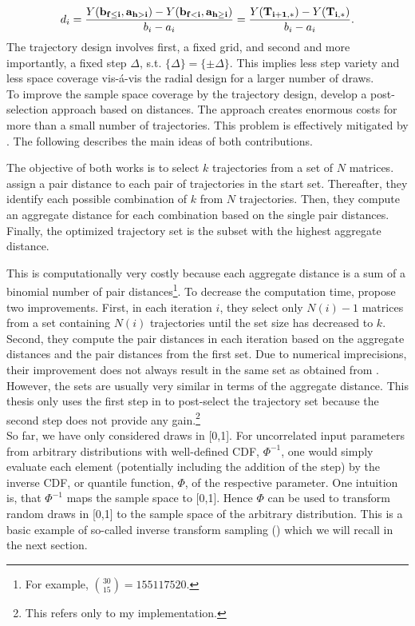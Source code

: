\begin{align} \label{eq:traj}
d_i =  \frac{Y(\bold{b_{f \leq i}}, \bold{a_{h>i}}) - Y(\bold{b_{f<i}}, \bold{a_{h \geq i}})}{b_i - a_i} = \frac{Y(\bold{T_{i+1,*})} -  Y(\bold{T_{i,*}})}{b_i - a_i}.
\end{align}
The trajectory design involves first, a fixed grid, and second and more importantly, a fixed step $\Delta$, s.t. $\{\Delta\} = \{\pm \Delta\}$. This implies less step variety and less space coverage vis-á-vis the radial design for a larger number of draws.\\

\noindent
To improve the sample space coverage by the trajectory design, \cite{campolongo2007effective} develop a post-selection approach based on distances. The approach creates enormous costs for more than a small number of trajectories. This problem is effectively mitigated by \cite{ge2014efficient}. The following describes the main ideas of both contributions.

The objective of both works is to select $k$ trajectories from a set of $N$ matrices. \cite{campolongo2007effective} assign a pair distance to each pair of trajectories in the start set. Thereafter, they identify each possible combination of $k$ from $N$ trajectories. Then, they compute an aggregate distance for each combination based on the single pair distances. Finally, the optimized trajectory set is the subset with the highest aggregate distance.

This is computationally very costly because each aggregate distance is a sum of a binomial number of pair distances\footnote{For example, $\binom{30}{15} = 155117520$.}. To decrease the computation time, \cite{ge2014efficient} propose two improvements. First, in each iteration $i$, they select only $N(i)-1$ matrices from a set containing $N(i)$ trajectories until the set size has decreased to $k$. Second, they compute the pair distances in each iteration based on the aggregate distances and the pair distances from the first set. Due to numerical imprecisions, their improvement does not always result in the same set as obtained from \cite{campolongo2007effective}. However, the sets are usually very similar in terms of the aggregate distance. This thesis only uses the first step in \cite{ge2014efficient} to post-select the trajectory set because the second step does not provide any gain.\footnote{This refers only to my implementation.}\\


\noindent
So far, we have only considered draws in [0,1]. For uncorrelated input parameters from arbitrary distributions with well-defined CDF, $\Phi^{-1}$, one would simply evaluate each element (potentially including the addition of the step) by the inverse CDF, or quantile function, $\Phi$, of the respective parameter. One intuition is, that $\Phi^{-1}$ maps the sample space to [0,1]. Hence $\Phi$ can be used to transform random draws in [0,1] to the sample space of the arbitrary distribution. This is a basic example of so-called inverse transform sampling (\cite{devroye1986sample}) which we will recall in the next section.



